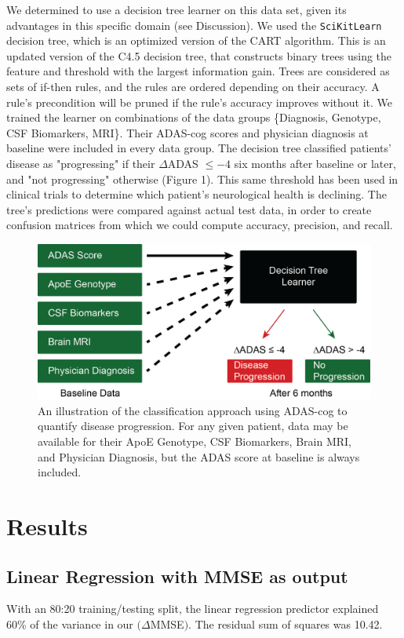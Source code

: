 \documentclass{article}
\begin{document}
We determined to use a decision tree learner on this data set, given its advantages in this specific domain (see Discussion). We used the {\tt SciKitLearn} decision tree, which is an optimized version of the CART algorithm. This is an updated version of the C4.5 decision tree, that constructs binary trees using the feature and threshold with the largest information gain. Trees are considered as sets of if-then rules, and the rules are ordered depending on their accuracy. A rule's precondition will be pruned if the rule's accuracy improves without it. We trained the learner on combinations of the data groups \{Diagnosis, Genotype, CSF Biomarkers, MRI\}. Their ADAS-cog scores and physician diagnosis at baseline were included in every data group. The decision tree classified patients' disease as "progressing" if their $\Delta$ADAS $\leq-4$ six months after baseline or later, and "not progressing" otherwise (Figure 1). This same threshold has been used in clinical trials to determine which patient's neurological health is declining. %
The tree's predictions were compared against actual test data, in order to create confusion matrices from which we could compute accuracy, precision, and recall.
\begin{figure}

    \includegraphics[width=.5\textwidth]{ADNIFlowchart.png}
    \caption{An illustration of the classification approach using ADAS-cog to quantify disease progression. For any given patient, data may be available for their ApoE Genotype, CSF Biomarkers, Brain MRI, and Physician Diagnosis, but the ADAS score at baseline is always included.}
\end{figure}


\section{Results}


\subsection{Linear Regression with MMSE as output}
With an 80:20 training/testing split, the linear regression predictor explained 60\% of the variance in our $(\Delta$MMSE$)$. The residual sum of squares was 10.42.
\end{document}

